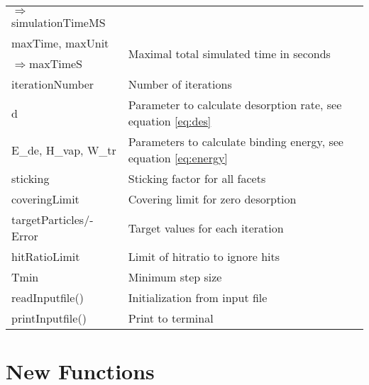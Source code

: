 \begin{center}
\begin{tabular}{|l|l|}
\enskip$\Rightarrow$simulationTimeMS&\\
\rule{0pt}{3ex} maxTime, maxUnit& \multirow{2}{*}{Maximal total simulated time in seconds}\\
\enskip$\Rightarrow$maxTimeS&\\
\rule{0pt}{3ex} iterationNumber& Number of iterations\\
\rule{0pt}{3ex}  d& Parameter to calculate desorption rate, see equation \ref{eq:des}\\
\rule{0pt}{3ex}  E\_de, H\_vap, W\_tr& Parameters to calculate binding energy, see equation \ref{eq:energy}\\
\rule{0pt}{3ex}  sticking&  Sticking factor for all facets\\
\rule{0pt}{3ex}  coveringLimit&  Covering limit for zero desorption \\
\rule{0pt}{3ex}  targetParticles/-Error&  Target values for each iteration\\
\rule{0pt}{3ex}  hitRatioLimit&  Limit of hitratio to ignore hits\\
\rule{0pt}{3ex}  Tmin&  Minimum step size\\
\hline
\rule{0pt}{3ex} readInputfile()& Initialization from input file\\
\rule{0pt}{3ex} printInputfile()& Print to terminal\\
\hline
\end{tabular}
\end{center}

\section{New Functions}
